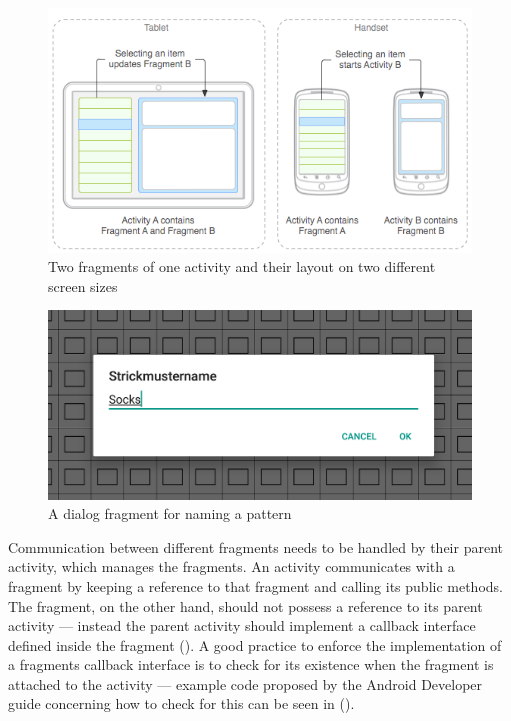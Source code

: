 \begin{figure}[h]
  \centering
    \includegraphics[width=.7\textwidth]{images/fragments.png}
   \caption[Two fragments of one activity and their layout on two different screen sizes. \protect{}]{Two fragments of one activity and their layout on two different screen sizes} 
    \label{fig:fragments_uimodules} 
\end{figure}

\begin{figure}[H]
  \centering
  \includegraphics[width=.7\textwidth]{images/pattern_name_dialog.png}
  \caption[A dialog fragment for naming a pattern \protect{}]{A dialog fragment for naming a pattern} 
  \label{fig:fragment_dialog} 
\end{figure}

Communication between different fragments needs to be handled by their parent activity, which manages the fragments. An activity communicates with a fragment by keeping a reference to that fragment and calling its public methods. The fragment, on the other hand, should not possess a reference to its parent activity --- instead the parent activity should implement a callback interface defined inside the fragment (\cite{fragment_event_callback}). A good practice to enforce the implementation of a fragments callback interface is to check for its existence when the fragment is attached to the activity --- example code proposed by the Android Developer guide concerning how to check for this can be seen in  (\cite{fragment_event_callback}).


